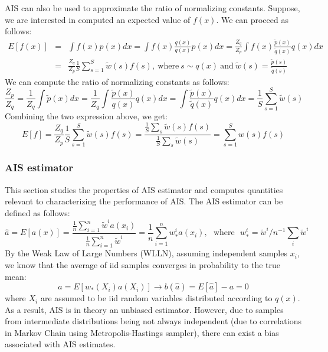 AIS can also be used to approximate the ratio of normalizing constants. Suppose, we are interested in computed an expected value of $f(x)$. We can proceed as follows:
\begin{eqnarray}
    E[f(x)] &=& \int f(x)p(x)dx = \int f(x)\frac{q(x)}{q(x)}p(x)dx = \frac{Z_q}{Z_p}\int f(x)\frac{\tilde{p}(x)}{\tilde{q}(x)}q(x)dx \nonumber \\
    &=& \frac{Z_q}{Z_p}\frac{1}{S}\sum_{s=1}^{S}\tilde{w}(s)f(s),~\mathrm{where}~s\sim q(x)~\mathrm{and}~\tilde{w}(s) = \frac{\tilde{p}(s)}{\tilde{q}(s)}
\end{eqnarray}
We can compute the ratio of normalizing constants as follows:
\begin{equation}
    \frac{Z_p}{Z_q} = \frac{1}{Z_q}\int \tilde{p}(x)dx = \frac{1}{Z_q}\int \frac{\tilde{p}(x)}{q(x)}q(x)dx = \int \frac{\tilde{p}(x)}{\tilde{q}(x)}q(x)dx = \frac{1}{S}\sum_{s=1}^{S}\tilde{w}(s)
\end{equation}
Combining the two expression above, we get:
\begin{equation}
    E[f] = \frac{Z_q}{Z_p}\frac{1}{S}\sum_{s=1}^{S}\tilde{w}(s)f(s) = \frac{\frac{1}{S}\sum_s \tilde{w}(s)f(s)}{\frac{1}{S}\sum_s \tilde{w}(s)} = \sum_{s=1}^{S}w(s)f(s)
\end{equation}

\subsubsection{AIS estimator}

This section studies the properties of AIS estimator and computes quantities relevant to characterizing the performance of AIS. The AIS estimator can be defined as follows:
\begin{equation}
    \hat{a} = E[a(x)] = \frac{\frac{1}{n}\sum_{i=1}^{n} \tilde{w}^{i}a(x_i)}{\frac{1}{n}\sum_{i=1}^{n}\tilde{w}^{i}} = \frac{1}{n}\sum_{i=1}^{n} w_{\ast}^{i}a(x_i),~~~\mathrm{where}~~~w_{\ast}^{i} = \tilde{w}^{i} / n^{-1}\sum_i \tilde{w}^{i}
\end{equation}
By the Weak Law of Large Numbers (WLLN), assuming independent samples $x_i$, we know that the average of iid samples converges in probability to the true mean:
\begin{equation}
   a = E[w_{\ast}(X_i)a(X_i)] \rightarrow b(\hat{a}) = E[\hat{a}] - a = 0
\end{equation}
where $X_i$ are assumed to be iid random variables distributed according to $q(x)$. As a result, AIS is in theory an unbiased estimator. However, due to samples from intermediate distributions being not always independent (due to correlations in Markov Chain using Metropolis-Hastings sampler), there can exist a bias associated with AIS estimates.\\

